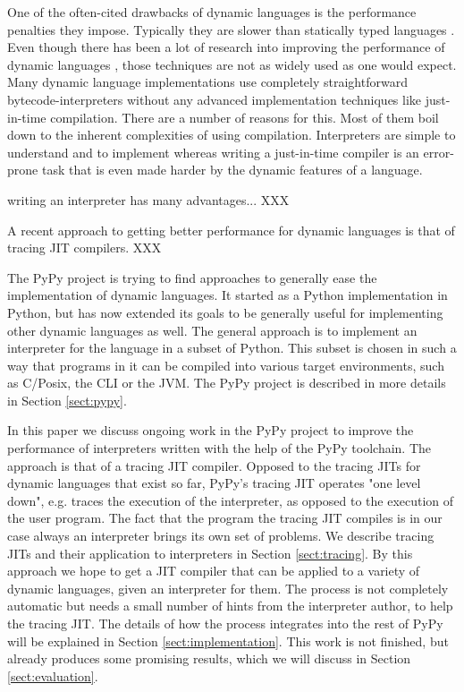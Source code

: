 \documentclass{acm_proc_article-sp}
\let\oldcite=\cite
\renewcommand\cite[1]{\ifthenelse{\equal{#1}{XXX}}{[citation~needed]}{\oldcite{#1}}}
\begin{document}
One of the often-cited drawbacks of dynamic languages is the performance
penalties they impose. Typically they are slower than statically typed languages
\cite{XXX}. Even though there has been a lot of research into improving the
performance of dynamic languages \cite{XXX}, those techniques are not as widely
used as one would expect. Many dynamic language implementations use completely
straightforward bytecode-interpreters without any advanced implementation
techniques like just-in-time compilation. There are a number of reasons for
this. Most of them boil down to the inherent complexities of using compilation.
Interpreters are simple to understand and to implement whereas writing a
just-in-time compiler is an error-prone task that is even made harder by the
dynamic features of a language.

writing an interpreter has many advantages... XXX

A recent approach to getting better performance for dynamic languages is that of
tracing JIT compilers. XXX

The PyPy project is trying to find approaches to generally ease the
implementation of dynamic languages. It started as a Python implementation in
Python, but has now extended its goals to be generally useful for implementing
other dynamic languages as well. The general approach is to implement an
interpreter for the language in a subset of Python. This subset is chosen in
such a way that programs in it can be compiled into various target environments,
such as C/Posix, the CLI or the JVM. The PyPy project is described in more
details in Section \ref{sect:pypy}.

In this paper we discuss ongoing work in the PyPy project to improve the
performance of interpreters written with the help of the PyPy toolchain. The
approach is that of a tracing JIT compiler. Opposed to the tracing JITs for dynamic
languages that exist so far, PyPy's tracing JIT operates "one level down",
e.g. traces the execution of the interpreter, as opposed to the execution
of the user program. The fact that the program the tracing JIT compiles is
in our case always an interpreter brings its own set of problems. We describe
tracing JITs and their application to interpreters in Section
\ref{sect:tracing}.  By this approach we hope to get a JIT compiler that can be
applied to a variety of dynamic languages, given an interpreter for them. The
process is not completely automatic but needs a small number of hints from the
interpreter author, to help the tracing JIT. The details of how the process
integrates into the rest of PyPy will be explained in Section
\ref{sect:implementation}. This work is not finished, but already produces some
promising results, which we will discuss in Section \ref{sect:evaluation}.
\end{document}
